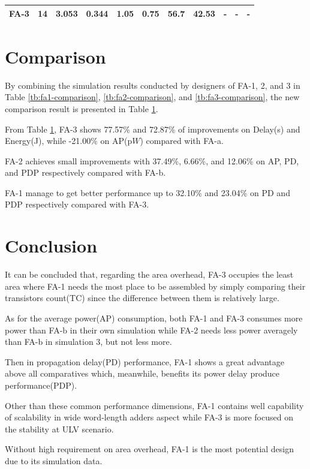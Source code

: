 \documentclass[conference]{IEEEtran}
\begin{document}
\begin{table}[!ht]
\begin{threeparttable}[b]
\begin{tabular}{ c c | *{3}{l} | *{3}{l} | *{3}{l}}
			\cite{18743001}        FA-3 & \bfseries 14 & 3.053                                                                    & \bfseries 0.344                                                       & \bfseries 1.05                                                        & 0.75                  & 56.7           & 42.53             & -                     & -               & -                \\
			\hline
		\end{tabular}
		\label{tb:combine}
	\end{threeparttable}
\end{table}

\newpage

\section{Comparison}
\label{sec:5}

By combining the simulation results conducted by designers of FA-1, 2, and 3 in Table \ref{tb:fa1-comparison}, \ref{tb:fa2-comparison}, and \ref{tb:fa3-comparison},
the new comparison result is presented in Table \ref{tb:combine}.

From Table \ref{tb:combine}, FA-3 shows 77.57\% and 72.87\% of improvements on Delay(\textmugreek s) and Energy(\textalpha J), while -21.00\% on AP(p\(W\)) compared with FA-a.

FA-2 achieves small improvements with 37.49\%, 6.66\%, and 12.06\% on AP, PD, and PDP respectively compared with FA-b.

FA-1 manage to get better performance up to 32.10\% and 23.04\% on PD and PDP respectively compared with FA-3.

\section{Conclusion}
\label{sec:6}

It can be concluded that, regarding the area overhead,
FA-3 occupies the least area where FA-1 needs the most place to be assembled by simply comparing their transistors count(TC)
since the difference between them is relatively large.

As for the average power(AP) consumption, both FA-1 and FA-3 consumes more power than FA-b in their own simulation
while FA-2 needs less power averagely than FA-b in simulation 3, but not less more.

Then in propagation delay(PD) performance, FA-1 shows a great advantage above all comparatives which, meanwhile, benefits its power delay produce performance(PDP).

Other than these common performance dimensions, FA-1 contains well capability of scalability in wide word-length adders aspect
while FA-3 is more focused on the stability at ULV scenario.

Without high requirement on area overhead, FA-1 is the most potential design due to its simulation data.

\newpage



\end{document}
